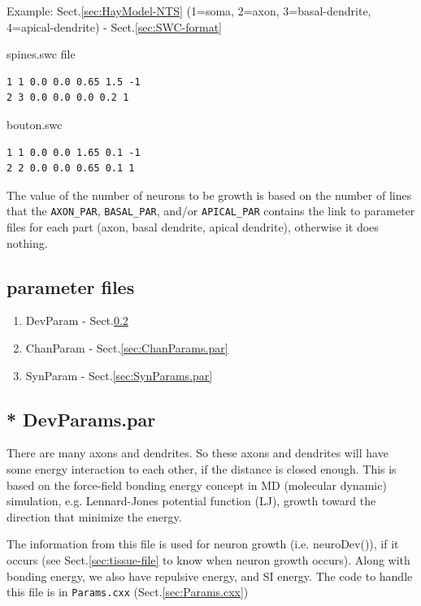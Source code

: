 Example: Sect.\ref{sec:HayModel-NTS} (1=soma,
2=axon, 3=basal-dendrite, 4=apical-dendrite) - Sect.\ref{sec:SWC-format}
\begin{multicols}{2}
spines.swc file
\begin{verbatim}
1 1 0.0 0.0 0.65 1.5 -1
2 3 0.0 0.0 0.0 0.2 1
\end{verbatim}
\columnbreak
bouton.swc
\begin{verbatim} 
1 1 0.0 0.0 1.65 0.1 -1
2 2 0.0 0.0 0.65 0.1 1
\end{verbatim}
\end{multicols}

The value of the number of neurons to be growth is based on the number of lines
that the \verb!AXON_PAR!, \verb!BASAL_PAR!, and/or \verb!APICAL_PAR! contains
the link to parameter files for each part (axon, basal dendrite, apical
dendrite), otherwise it does nothing.


\subsection{parameter files}
\label{sec:NTS-parameter-files}

\begin{enumerate}
  \item DevParam - Sect.\ref{sec:DevParams.par}
  \item ChanParam - Sect.\ref{sec:ChanParams.par}
  \item SynParam - Sect.\ref{sec:SynParams.par}
\end{enumerate}
\subsection{* DevParams.par}
\label{sec:DevParams.par}


\begin{mdframed}
There are many axons and dendrites. So these axons and dendrites will have
some energy interaction to each other, if the distance is closed enough.
This is based on the force-field bonding energy concept in MD (molecular
dynamic) simulation, e.g. Lennard-Jones potential function (LJ), growth toward
the direction that minimize the energy.
\end{mdframed}

The information from this file is used for neuron growth (i.e. neuroDev()), if
it occurs (see Sect.\ref{sec:tissue-file} to know when neuron growth occurs).
Along with bonding energy, we also have repulsive energy, and SI energy.
The code to handle this file is in \verb!Params.cxx! (Sect.\ref{sec:Params.cxx})

